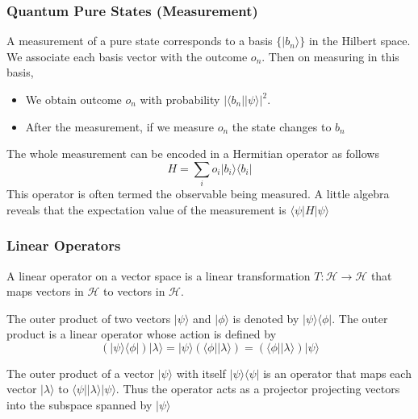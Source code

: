 \documentclass{beamer}
\newcommand{\bra}[1]{\langle #1 \vert}
\newcommand{\ket}[1]{\vert #1 \rangle}
\begin{document}
\begin{frame}
  \frametitle{Quantum Pure States (Measurement)}
  A measurement of a pure state corresponds to a basis $\{\ket{b_n}\}$ in the Hilbert space. We associate each basis vector with the outcome $o_n$. Then on measuring in this basis,
  \begin{itemize}
  \item We obtain outcome $o_n$ with probability $|\bra{b_n}\ket{\psi}|^2$.
    
  \item After the measurement, if we measure $o_n$ the state changes to $b_n$
  \end{itemize}
  The whole measurement can be encoded in a Hermitian operator as follows
  \[
    H = \sum_i o_i \ket{b_i}\bra{b_i}
  \]
  This operator is often termed the observable being measured. A little algebra reveals that the expectation value of the measurement is $\bra{\psi}H\ket{\psi}$
\end{frame}


\begin{frame}
  \frametitle{Linear Operators}
  A linear operator on a vector space is a linear transformation $T : \mathcal{H} \rightarrow \mathcal{H}$ that maps vectors in $\mathcal{H}$ to vectors in $\mathcal{H}$.

  The outer product of two vectors $\ket{\psi}$ and $\ket{\phi}$ is denoted by $\ket{\psi}\bra{\phi}$. The outer product is a linear operator whose action is defined by
  $$
  (\ket{\psi}\bra{\phi})\ket{\lambda}=\ket{\psi}(\bra{\phi}\ket{\lambda}) = (\bra{\phi}\ket{\lambda})\ket{\psi}
  $$

  The outer product of a vector $\ket{\psi}$ with itself $\ket{\psi}\bra{\psi}$ is an operator that maps each vector $\ket{\lambda}$ to $\bra{\psi}\ket{\lambda}\ket{\psi}$. Thus the operator acts as a projector projecting vectors into the subspace spanned by $\ket{\psi}$
\end{frame}
\end{document}
